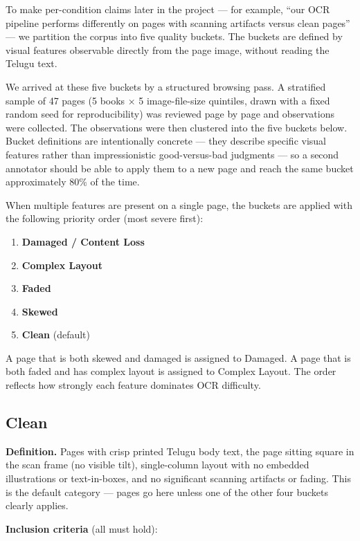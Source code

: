 \documentclass[
  letterpaper,
  DIV=11,
  numbers=noendperiod]{scrartcl}
\providecommand{\tightlist}{%
  \setlength{\itemsep}{0pt}\setlength{\parskip}{0pt}}
\begin{document}
To make per-condition claims later in the project --- for example, ``our
OCR pipeline performs differently on pages with scanning artifacts
versus clean pages'' --- we partition the corpus into five quality
buckets. The buckets are defined by visual features observable directly
from the page image, without reading the Telugu text.

We arrived at these five buckets by a structured browsing pass. A
stratified sample of 47 pages (5 books × 5 image-file-size quintiles,
drawn with a fixed random seed for reproducibility) was reviewed page by
page and observations were collected. The observations were then
clustered into the five buckets below. Bucket definitions are
intentionally concrete --- they describe specific visual features rather
than impressionistic good-versus-bad judgments --- so a second annotator
should be able to apply them to a new page and reach the same bucket
approximately 80\% of the time.

When multiple features are present on a single page, the buckets are
applied with the following priority order (most severe first):

\begin{enumerate}
\def\labelenumi{\arabic{enumi}.}
\tightlist
\item
  \textbf{Damaged / Content Loss}
\item
  \textbf{Complex Layout}
\item
  \textbf{Faded}
\item
  \textbf{Skewed}
\item
  \textbf{Clean} (default)
\end{enumerate}

A page that is both skewed and damaged is assigned to Damaged. A page
that is both faded and has complex layout is assigned to Complex Layout.
The order reflects how strongly each feature dominates OCR difficulty.

\subsection{Clean}\label{clean}

\textbf{Definition.} Pages with crisp printed Telugu body text, the page
sitting square in the scan frame (no visible tilt), single-column layout
with no embedded illustrations or text-in-boxes, and no significant
scanning artifacts or fading. This is the default category --- pages go
here unless one of the other four buckets clearly applies.

\textbf{Inclusion criteria} (all must hold):
\end{document}
